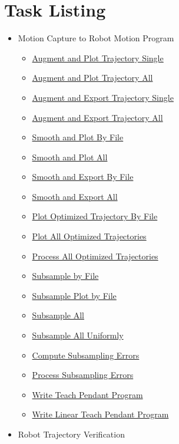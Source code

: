 \documentclass[letterpaper]{article}
\begin{document}
\section{Task Listing}
\begin{itemize}
	\item Motion Capture to Robot Motion Program
		\begin{itemize}
			\item \hyperref[augmentAndPlotTrajectorySingle]{Augment and Plot Trajectory Single}
			\item \hyperref[augmentAndPlotTrajectoryAll]{Augment and Plot Trajectory All}
			\item \hyperref[augmentAndExportTrajectorySingle]{Augment and Export Trajectory Single}
			\item \hyperref[augmentAndExportTrajectoryAll]{Augment and Export Trajectory All}
			\item \hyperref[smoothAndPlotByFile]{Smooth and Plot By File}
			\item \hyperref[smoothAndPlotAll]{Smooth and Plot All}
			\item \hyperref[smoothAndExportByFile]{Smooth and Export By File}
			\item \hyperref[smoothAndExportAll]{Smooth and Export All}
			\item \hyperref[plotOptimizedTrajByFile]{Plot Optimized Trajectory By File}
			\item \hyperref[plotAllOptimizedTraj]{Plot All Optimized Trajectories}
			\item \hyperref[processAllOptimizedTraj]{Process All Optimized Trajectories}
			\item \hyperref[subsampleByFile]{Subsample by File}
			\item \hyperref[subsamplePlotByFile]{Subsample Plot by File}
			\item \hyperref[subsampleAll]{Subsample All}
			\item \hyperref[subsampleAllUniform]{Subsample All Uniformly}
			\item \hyperref[computeSubsamplingErrors]{Compute Subsampling Errors}
			\item \hyperref[processAllSubsamplingErrors]{Process Subsampling Errors}
			\item \hyperref[writeTPProgram]{Write Teach Pendant Program}
			\item \hyperref[writeTPProgramLinear]{Write Linear Teach Pendant Program}
		\end{itemize}
	\item Robot Trajectory Verification

\end{itemize}
\end{document}
